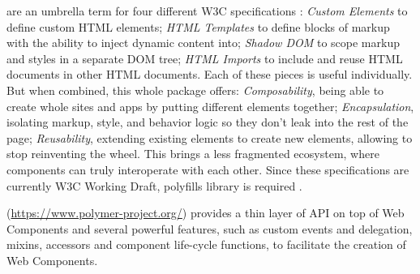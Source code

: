\begin{description}
\itemsep1pt\parskip0pt

\item[Web Components] are an umbrella term for four different W3C specifications \cite{w3c}:
\emph{Custom Elements} to define custom HTML elements;
\emph{HTML Templates} to define blocks of markup with the ability to inject dynamic content into;
\emph{Shadow DOM} to scope markup and styles in a separate DOM tree;
\emph{HTML Imports} to include and reuse HTML documents in other HTML documents.
Each of these pieces is useful individually. But when combined, this whole package offers:
\emph{Composability}, being able to create whole sites and apps by putting different elements together;
\emph{Encapsulation}, isolating markup, style, and behavior logic so they don't leak into the rest of the page;
\emph{Reusability}, extending existing elements to create new elements, allowing to stop reinventing the wheel.
This brings a less fragmented ecosystem, where components can truly interoperate with each other.
Since these specifications are currently W3C Working Draft, polyfills library is required \cite{webcomponents-polyfills}.
        
\item[Polymer library] (\url{https://www.polymer-project.org/}) provides a thin layer of API on top of Web Components and several powerful features, such as custom events and delegation, mixins, accessors and component life-cycle functions, to facilitate the creation of Web Components. 
\end{description}


 

